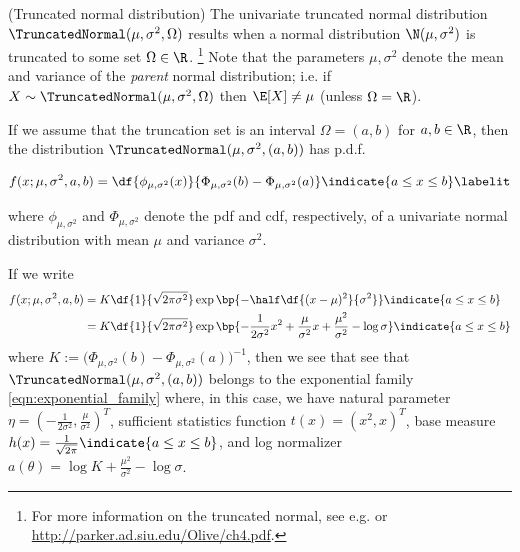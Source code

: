 \documentclass{article} %
\begin{document}
\begin{example}{(Truncated normal distribution)} 
\label{ex:truncated_normal_as_ef} The univariate truncated normal distribution $\TruncatedNormal(\mu,  \sigma^2,  \Omega)$ results when a normal distribution $\N(\mu,  \sigma^2)$ is truncated to some set $\Omega \in \R$. \footnote{For more information on the truncated normal,  see e.g.  \cite{burkardt2014truncated} or \url{http://parker.ad.siu.edu/Olive/ch4.pdf}.}   Note that the parameters $\mu, \sigma^2$ denote the mean and variance of the \textit{parent} normal distribution;  i.e.  if $X \sim \TruncatedNormal(\mu,  \sigma^2,  \Omega)$ then $\E[X] \neq \mu$ (unless $\Omega = \R$). 

If we assume that the truncation set is an interval $\Omega = (a,b)$ for $a,b \in \R$,  then the distribution $\TruncatedNormal(\mu,  \sigma^2,  (a,b))$ has p.d.f.

\begin{align*}
f(x ; \mu,  \sigma^2,  a,  b) = \df{\phi_{\mu, \sigma^2} (x) }{\Phi_{\mu, \sigma^2} (b)  - \Phi_{\mu, \sigma^2} (a) } \indicate{a \leq x \leq b} \labelit \label{eqn:pdf_of_normal_truncated_to_an_interval}
\end{align*} 

where $\phi_{\mu,  \sigma^2}$ and $\Phi_{\mu,  \sigma^2}$ denote the pdf and cdf,  respectively,  of a univariate normal distribution with mean $\mu$ and variance $\sigma^2$.   

If we write
\begin{align*}
f(x ; \mu,  \sigma^2,  a,  b) & = K \df{1}{\sqrt{2 \pi \sigma^2}} \exp \bp{-\half \df{(x-\mu)^2}{\sigma^2}}  \indicate{a \leq x \leq b} \\
& = K \df{1}{\sqrt{2 \pi \sigma^2}} \exp \bp{ - \frac{1}{2 \sigma^2} x^2 + \frac{\mu}{\sigma^2} x  + \frac{\mu^2}{\sigma^2}  - \log \sigma}  \indicate{a \leq x \leq b} 
\end{align*} 
where $K := \big( \Phi_{\mu, \sigma^2} (b)  - \Phi_{\mu, \sigma^2} (a) \big)^{-1}$,  then we see that see that  $\TruncatedNormal(\mu,  \sigma^2,  (a,b))$ belongs to the exponential family \eqref{eqn:exponential_family} where,  in this case,  we have natural parameter $\eta = (- \frac{1}{2 \sigma^2},  \frac{\mu}{\sigma^2})^T$,  sufficient statistics function $t(x) = (x^2,  x)^T$,  base measure $h(x) =  \frac{1}{\sqrt{2 \pi}}  \indicate{a \leq x \leq b}$,  and log normalizer $a(\theta) = \log K + \frac{\mu^2}{\sigma^2} - \log \sigma$.
 
\end{example}
\end{document}
